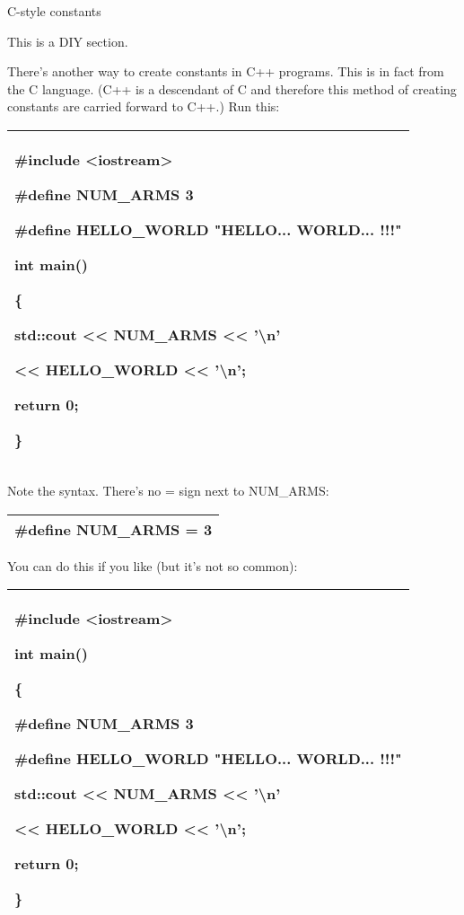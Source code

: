 \documentclass[
]{article}
\begin{document}
C-style constants

This is a DIY section.

There's another way to create constants in C++ programs. This is in fact
from the C language. (C++ is a descendant of C and therefore this method
of creating constants are carried forward to C++.) Run this:

\begin{longtable}[]{@{}l@{}}
\toprule
\endhead
\begin{minipage}[t]{0.97\columnwidth}\raggedright
\#include \textless iostream\textgreater{}

\#define NUM\_ARMS 3

\#define HELLO\_WORLD "HELLO... WORLD... !!!"

int main()

\{

std::cout \textless\textless{} NUM\_ARMS \textless\textless{}
'\textbackslash n'

\textless\textless{} HELLO\_WORLD \textless\textless{}
'\textbackslash n';

return 0;

\}\strut
\end{minipage}\tabularnewline
\bottomrule
\end{longtable}

Note the syntax. There's no = sign next to NUM\_ARMS:

\begin{longtable}[]{@{}l@{}}
\toprule
\endhead
\#define NUM\_ARMS = 3\tabularnewline
\bottomrule
\end{longtable}

You can do this if you like (but it's not so common):

\begin{longtable}[]{@{}l@{}}
\toprule
\endhead
\begin{minipage}[t]{0.97\columnwidth}\raggedright
\#include \textless iostream\textgreater{}

int main()

\{

\#define NUM\_ARMS 3

\#define HELLO\_WORLD "HELLO... WORLD... !!!"

std::cout \textless\textless{} NUM\_ARMS \textless\textless{}
'\textbackslash n'

\textless\textless{} HELLO\_WORLD \textless\textless{}
'\textbackslash n';

return 0;

\}\strut
\end{minipage}\tabularnewline
\bottomrule
\end{longtable}
\end{document}
